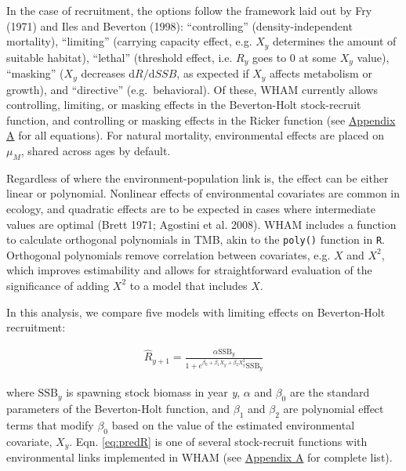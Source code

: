 \documentclass[]{article}
\begin{document}
In the case of recruitment, the options follow the framework laid out by
Fry (1971) and Iles and Beverton (1998): ``controlling''
(density-independent mortality), ``limiting'' (carrying capacity effect,
e.g. \(X_y\) determines the amount of suitable habitat), ``lethal''
(threshold effect, i.e. \(R_y\) goes to 0 at some \(X_y\) value),
``masking'' (\(X_y\) decreases \(\text{d}R/\text{d}SSB\), as expected if
\(X_y\) affects metabolism or growth), and ``directive''
(e.g.~behavioral). Of these, WHAM currently allows controlling,
limiting, or masking effects in the Beverton-Holt stock-recruit
function, and controlling or masking effects in the Ricker function (see
\protect\hyperlink{appendix-a}{Appendix A} for all equations). For
natural mortality, environmental effects are placed on \(\mu_M\), shared
across ages by default.

Regardless of where the environment-population link is, the effect can
be either linear or polynomial. Nonlinear effects of environmental
covariates are common in ecology, and quadratic effects are to be
expected in cases where intermediate values are optimal (Brett 1971;
Agostini et al. 2008). WHAM includes a function to calculate orthogonal
polynomials in TMB, akin to the \texttt{poly()} function in \texttt{R}.
Orthogonal polynomials remove correlation between covariates, e.g. \(X\)
and \(X^2\), which improves estimability and allows for straightforward
evaluation of the significance of adding \(X^2\) to a model that
includes \(X\).

In this analysis, we compare five models with limiting effects on
Beverton-Holt recruitment:

\begin{equation}
\label{eq:predR}
  \begin{array}{ccc}
    \hat{R}_{y+1} = \frac{\alpha \text{SSB}_{y}}{1 + e^{\beta_0 + \beta_1 X_{y} + \beta_2 X^2_{y}} \text{SSB}_y}
  \end{array}
\end{equation}

where \(\text{SSB}_y\) is spawning stock biomass in year \emph{y},
\(\alpha\) and \(\beta_0\) are the standard parameters of the
Beverton-Holt function, and \(\beta_1\) and \(\beta_2\) are polynomial
effect terms that modify \(\beta_0\) based on the value of the estimated
environmental covariate, \(X_y\). Eqn. \ref{eq:predR} is one of several
stock-recruit functions with environmental links implemented in WHAM
(see \protect\hyperlink{appendix-a}{Appendix A} for complete list).
\end{document}
